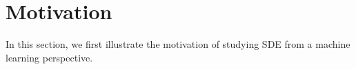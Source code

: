 \section{Motivation}

In this section, we first illustrate the motivation of studying SDE from a machine learning perspective.